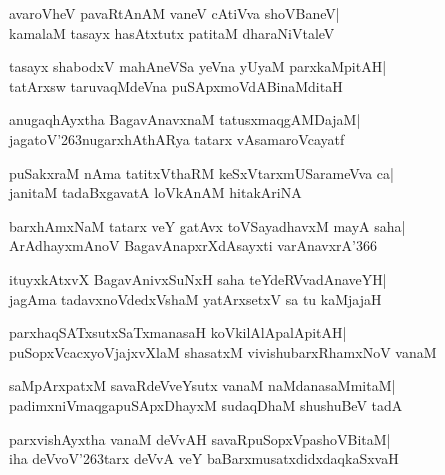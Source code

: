 \documentclass[twoside,12pt,openright]{book}
\def\S{\char'263}
\newcounter{shloka}[chapter]
\begin{document}
\begin{shloka}%
avaroVheV pavaRtAnAM vaneV cAtiVva shoVBaneV|\\
kamalaM tasayx hasAtxtutx patitaM dharaNiVtaleV
\end{shloka}

\begin{shloka}%
tasayx shabodxV mahAneVSa yeVna yUyaM parxkaMpitAH|\\
tatArxsw taruvaqMdeVna puSApxmoVdABinaMditaH
\end{shloka}

\begin{shloka}%
anugaqhAyxtha BagavAnavxnaM tatusxmaqgAMDajaM|\\
jagatoV\S nugarxhAthARya tatarx vAsamaroVcayatf
\end{shloka}

\begin{shloka}%
puSakxraM nAma tatitxVthaRM keSxVtarxmUSarameVva ca|\\
janitaM tadaBxgavatA loVkAnAM hitakAriNA
\end{shloka}

\begin{shloka}%
barxhAmxNaM tatarx veY gatAvx toVSayadhavxM mayA saha|\\
ArAdhayxmAnoV BagavAnapxrXdAsayxti varAnavxrA\char'366
\end{shloka}

\begin{shloka}%
ituyxkAtxvX BagavAnivxSuNxH saha teYdeRVvadAnaveYH|\\
jagAma tadavxnoVdedxVshaM yatArxsetxV sa tu kaMjajaH
\end{shloka}

\begin{shloka}%
parxhaqSATxsutxSaTxmanasaH koVkilAlApalApitAH|\\
puSopxVcacxyoVjajxvXlaM shasatxM vivishubarxRhamxNoV vanaM
\end{shloka}

\begin{shloka}%
saMpArxpatxM savaRdeVveYsutx vanaM naMdanasaMmitaM|\\
padimxniVmaqgapuSApxDhayxM sudaqDhaM shushuBeV tadA
\end{shloka}

\begin{shloka}%
parxvishAyxtha vanaM deVvAH savaRpuSopxVpashoVBitaM|\\
iha deVvoV\S tarx deVvA veY baBarxmusatxdidxdaqkaSxvaH
\end{shloka}
\end{document}
